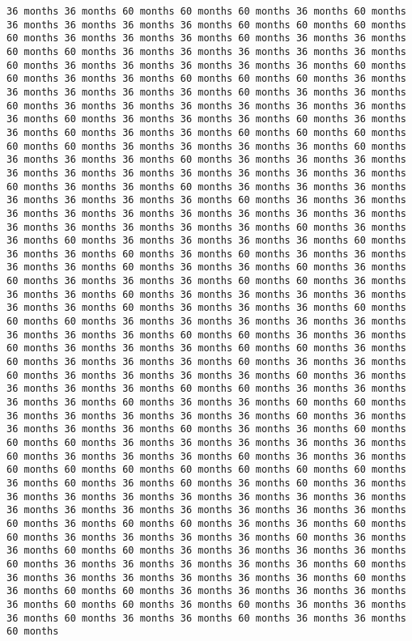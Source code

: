 \documentclass[11pt]{article}
\begin{document}
\begin{Verbatim}[commandchars=\\\{\}, frame=single, framerule=2mm, rulecolor=\color{outerrorbackground}]
36 months 36 months 60 months 60 months 60 months 36 months 60 months 36 months 36 months 36 months 36 months 60 months 60 months 60 months 60 months 36 months 36 months 36 months 60 months 36 months 36 months 60 months 60 months 36 months 36 months 36 months 36 months 36 months 60 months 36 months 36 months 36 months 36 months 36 months 60 months 60 months 36 months 36 months 60 months 60 months 60 months 36 months 36 months 36 months 36 months 36 months 60 months 36 months 36 months 60 months 36 months 36 months 36 months 36 months 36 months 36 months 36 months 60 months 36 months 36 months 36 months 60 months 36 months 36 months 60 months 36 months 36 months 60 months 60 months 60 months 60 months 60 months 36 months 36 months 36 months 36 months 60 months 36 months 36 months 36 months 60 months 36 months 36 months 36 months 36 months 36 months 36 months 36 months 36 months 36 months 36 months 60 months 36 months 36 months 60 months 36 months 36 months 36 months 36 months 36 months 36 months 36 months 60 months 36 months 36 months 36 months 36 months 36 months 36 months 36 months 36 months 36 months 36 months 36 months 36 months 36 months 36 months 60 months 36 months 36 months 60 months 36 months 36 months 36 months 36 months 60 months 36 months 36 months 60 months 36 months 60 months 36 months 36 months 36 months 36 months 60 months 36 months 36 months 60 months 36 months 60 months 36 months 36 months 36 months 60 months 60 months 36 months 36 months 36 months 60 months 36 months 36 months 36 months 36 months 36 months 36 months 60 months 36 months 36 months 36 months 60 months 60 months 60 months 36 months 36 months 36 months 36 months 36 months 36 months 36 months 36 months 60 months 60 months 36 months 36 months 60 months 36 months 36 months 36 months 60 months 60 months 36 months 60 months 36 months 36 months 36 months 60 months 36 months 36 months 60 months 36 months 36 months 36 months 36 months 60 months 36 months 36 months 36 months 36 months 60 months 60 months 36 months 36 months 36 months 36 months 60 months 36 months 36 months 60 months 60 months 36 months 36 months 36 months 36 months 36 months 60 months 36 months 36 months 36 months 36 months 60 months 36 months 36 months 60 months 60 months 60 months 36 months 36 months 36 months 36 months 36 months 60 months 36 months 36 months 36 months 60 months 36 months 36 months 60 months 60 months 60 months 60 months 60 months 60 months 60 months 36 months 60 months 36 months 60 months 36 months 60 months 36 months 36 months 36 months 36 months 36 months 36 months 36 months 36 months 36 months 36 months 36 months 36 months 36 months 36 months 36 months 60 months 36 months 60 months 60 months 36 months 36 months 60 months 60 months 36 months 36 months 36 months 36 months 60 months 36 months 36 months 60 months 60 months 36 months 36 months 36 months 36 months 60 months 36 months 36 months 36 months 36 months 36 months 60 months 36 months 36 months 36 months 36 months 36 months 36 months 60 months 36 months 60 months 60 months 36 months 36 months 36 months 36 months 36 months 60 months 60 months 36 months 60 months 36 months 36 months 36 months 60 months 36 months 36 months 60 months 36 months 36 months 60 months 
\end{Verbatim}
\end{document}
